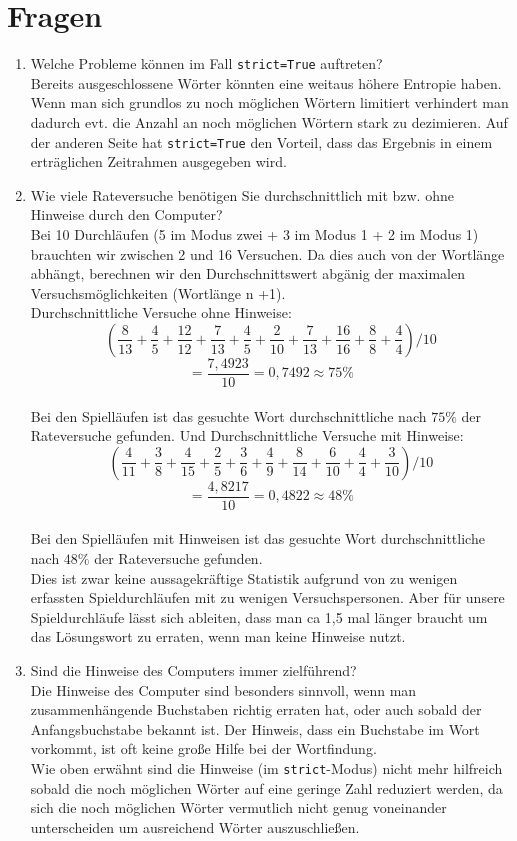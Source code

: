 \documentclass[12pt]{scrartcl} %
\begin{document}
\section{Fragen}
    \begin{enumerate}
        \item 
        Welche Probleme können im Fall \texttt{strict=True} auftreten? \\
        Bereits ausgeschlossene Wörter könnten eine weitaus höhere Entropie haben. Wenn man sich grundlos zu noch möglichen Wörtern limitiert verhindert man dadurch evt. die Anzahl an noch möglichen Wörtern stark zu dezimieren. Auf der anderen Seite hat \texttt{strict=True} den Vorteil, dass das Ergebnis in einem erträglichen Zeitrahmen ausgegeben wird.
                \vspace{1cm}
    \item           
	Wie viele Rateversuche benötigen Sie durchschnittlich mit bzw. ohne Hinweise durch den Computer? \\
                 Bei 10 Durchläufen (5 im Modus zwei + 3 im Modus 1 + 2 im Modus 1) brauchten wir zwischen 2 und 16 Versuchen. Da dies auch von der Wortlänge abhängt, berechnen wir den Durchschnittswert abgänig der maximalen Versuchsmöglichkeiten (Wortlänge n +1). \\
                 Durchschnittliche Versuche ohne Hinweise: $$(\frac{8}{13}+\frac{4}{5}+\frac{12}{12}+\frac{7}{13}+\frac{4}{5}+\frac{2}{10}+\frac{7}{13}+\frac{16}{16}+\frac{8}{8}+\frac{4}{4})/10 $$ 
                 $$= \frac{7,4923}{10} = 0,7492 \approx 75\%$$ \\
                 Bei den Spielläufen ist das gesuchte Wort durchschnittliche nach $75\%$ der Rateversuche gefunden.
                 Und Durchschnittliche Versuche mit Hinweise: $$(\frac{4}{11}+\frac{3}{8}+\frac{4}{15}+\frac{2}{5}+\frac{3}{6}+\frac{4}{9}+\frac{8}{14}+\frac{6}{10}+\frac{4}{4}+\frac{3}{10})/10 $$ 
                 $$= \frac{4,8217}{10} = 0,4822 \approx 48\%$$ \\
                 Bei den Spielläufen mit Hinweisen ist das gesuchte Wort durchschnittliche nach $48\%$ der Rateversuche gefunden.
                 \\ 
                 Dies ist zwar keine aussagekräftige Statistik aufgrund von zu wenigen erfassten Spieldurchläufen mit zu wenigen Versuchspersonen. Aber für unsere Spieldurchläufe lässt sich ableiten, dass man ca 1,5 mal länger braucht um das Lösungswort zu erraten, wenn man keine Hinweise nutzt.
    \item 
        Sind die Hinweise des Computers immer zielführend? \\
                 Die Hinweise des Computer sind besonders sinnvoll, wenn man zusammenhängende Buchstaben richtig erraten hat, oder auch sobald der Anfangsbuchstabe bekannt ist. Der Hinweis, dass ein Buchstabe im Wort vorkommt, ist oft keine große Hilfe bei der Wortfindung. \\
                 Wie oben erwähnt sind die Hinweise (im \texttt{strict}-Modus) nicht mehr hilfreich sobald die noch möglichen Wörter auf eine geringe Zahl reduziert werden, da sich die noch möglichen Wörter vermutlich nicht genug voneinander unterscheiden um ausreichend Wörter auszuschließen.
                 
        
	
    \end{enumerate}
\end{document}
